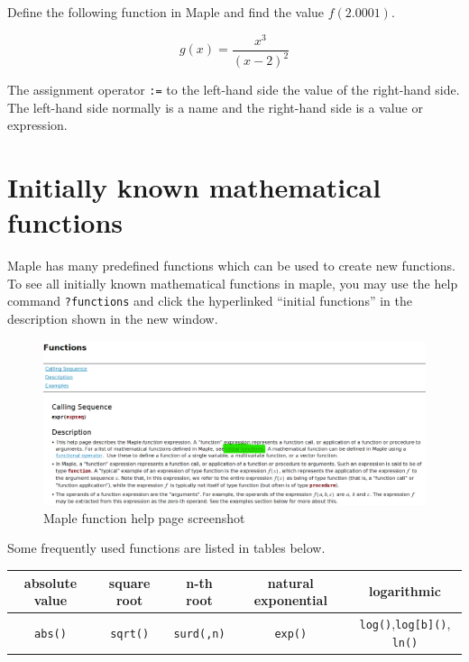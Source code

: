 \documentclass[]{book}
\theoremstyle{definition}
\theoremstyle{definition}
\theoremstyle{definition}
\theoremstyle{remark}
\let\BeginKnitrBlock\begin \let\EndKnitrBlock\end
\begin{document}
\BeginKnitrBlock{exercise}
\protect\hypertarget{exr:unnamed-chunk-3}{}{\label{exr:unnamed-chunk-3} }
Define the following function in Maple and find the value \(f(2.0001)\).

\[
g(x)=\dfrac{x^3}{(x-2)^2}
\]
\EndKnitrBlock{exercise}

\BeginKnitrBlock{remark}
{}
The assignment operator \texttt{:=} to the left-hand side the value of the right-hand side. The left-hand side normally is a name and the right-hand side is a value or expression.
\EndKnitrBlock{remark}

\hypertarget{initially-known-mathematical-functions}{%
\section{Initially known mathematical functions}\label{initially-known-mathematical-functions}}

Maple has many predefined functions which can be used to create new functions. To see all initially known mathematical functions in maple, you may use the help command \texttt{?functions} and click the hyperlinked ``initial functions'' in the description shown in the new window.

\begin{figure}
\centering
\includegraphics{figs/Initial-Functions.PNG}
\caption{Maple function help page screenshot}
\end{figure}

Some frequently used functions are listed in tables below.

\begin{longtable}[]{@{}ccccc@{}}
\toprule
absolute value & square root & n-th root & natural exponential & logarithmic\tabularnewline
\midrule
\endhead
\texttt{abs()} & \texttt{sqrt()} & \texttt{surd(,n)} & \texttt{exp()} & \texttt{log()},\texttt{log{[}b{]}()}, \texttt{ln()}\tabularnewline
\bottomrule
\end{longtable}
\end{document}
